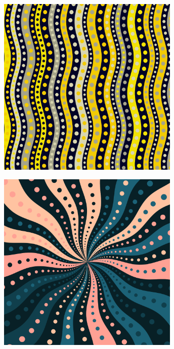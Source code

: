 \documentclass[11pt,twoside]{book}
\begin{document}
\begin{figure}[!ht]
\includegraphics[width=246pt]{lemon-b3a5f4a7-c042-4894-a977-e7d249368de6.png}
\end{figure}
\newpage
{}
\fancyfoot[CE,CO]{\fontsize{10}{12}\selectfont \thepage}
\begin{figure}[!ht]
\includegraphics[width=246pt]{slate-and-peach-d44c6da6-a2aa-4341-b072-daaa5d4e5226.png}
\end{figure}
\newpage
{}
\fancyfoot[CE,CO]{\fontsize{10}{12}\selectfont \thepage}
\end{document}
